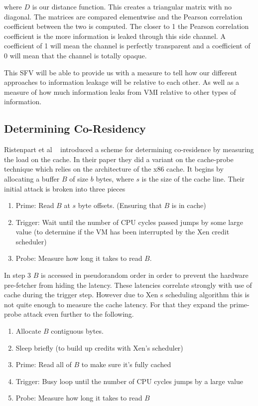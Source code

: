 where $D$ is our distance function.  This creates a triangular matrix with no diagonal. The matrices are compared elementwise and the Pearson correlation coefficient between the two is computed. The closer to 1 the Pearson correlation coefficient is the more information is leaked through this side channel. A coefficient of 1 will mean the channel is perfectly transparent and a coefficient of 0 will mean that the channel is totally opaque. 

This SFV will be able to provide us with a measure to tell how our different approaches to information leakage will be relative to each other. As well as a measure of how much information leaks from VMI relative to other types of information.

\subsection{Determining Co-Residency}

Ristenpart et al ~\cite{ristenpart_hey_2009} introduced a scheme for determining co-residence by measuring the load on the cache. In their paper they did a variant on the cache-probe technique which relies on the architecture of the x86 cache. It begins by allocating a buffer $B$ of size $b$ bytes, where $s$ is the size of the cache line.  Their initial attack is broken into three pieces

\begin{enumerate}
	\item Prime: Read $B$ at $s$ byte offsets. (Ensuring that $B$ is in cache)
	\item Trigger: Wait until the number of CPU cycles passed jumps by some large value (to determine if the VM has been interrupted by the Xen credit scheduler)
	\item Probe: Measure how long it takes to read $B$.
\end{enumerate}

In step 3 $B$ is accessed in pseudorandom order in order to prevent the hardware pre-fetcher from hiding the latency. These latencies correlate strongly with use of cache during the trigger step. However due to Xen s scheduling algorithm this is not quite enough to measure the cache latency. For that they expand the prime-probe attack even further to the following.

\begin{enumerate}
	\item Allocate $B$ contiguous bytes.
	\item Sleep briefly (to build up credits with Xen's scheduler)
	\item Prime: Read all of $B$ to make sure it's fully cached
	\item Trigger: Busy loop until the number of CPU cycles jumps by a large value
	\item Probe: Measure how long it takes to read $B$
\end{enumerate}

